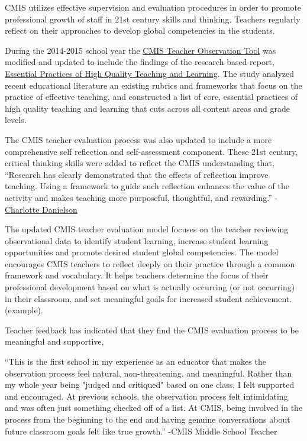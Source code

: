
\begin{findings}
CMIS utilizes effective supervision and evaluation procedures in order to promote professional growth of staff in 21st century skills and thinking. Teachers regularly reflect on their approaches to develop global competencies in the students.

During the 2014-2015 school year the \href{https://docs.google.com/document/d/15_5X5QtixmWVheEUBVO9N1aislsLDm_ZW4-4g4YQ7F4/edit?usp=sharing}{CMIS Teacher Observation Tool} was modified and updated to include the findings of the research based report, \href{https://drive.google.com/a/cmis.ac.th/file/d/0Bwny3HLdIIS7bXJ0dEpCWG51MTQ/view?usp=sharing}{Essential Practices of High Quality Teaching and Learning}. The study analyzed recent educational literature an existing rubrics and frameworks that focus on the practice of effective teaching, and constructed a list of core, essential practices of high quality teaching and learning that cuts across all content areas and grade levels. 

The CMIS teacher evaluation process was also updated to include a more comprehensive self reflection and self-assessment component. These 21st century, critical thinking skills were added to reflect the CMIS understanding that, ``Research has clearly demonstrated that the effects of reflection improve teaching. Using a framework to guide such reflection enhances the value of the activity and makes teaching more purposeful, thoughtful, and rewarding.'' -\href{http://www.ascd.org/publications/books/106034/chapters/Using-the-Framework.aspx}{Charlotte Danielson} 

The updated CMIS teacher evaluation model focuses on the teacher reviewing observational data to identify student learning, increase student learning opportunities and promote desired student global competencies. The  model encourages CMIS teachers to reflect deeply on their practice through a common framework and vocabulary. It helps teachers determine the focus of their professional development based on what is actually occurring (or not occurring) in their classroom, and set meaningful goals for increased student achievement. (example).

Teacher feedback has indicated that they find the CMIS evaluation process to be meaningful and supportive,  

``This is the first school in my experience as an educator that makes the observation process feel natural, non-threatening, and meaningful. Rather than my whole year being "judged and critiqued" based on one class, I felt supported and encouraged. At previous schools, the observation process felt intimidating and was often just something checked off of a list. At CMIS, being involved in the process from the beginning to the end and having genuine conversations about future classroom goals felt like true growth.''
                                                                                            -CMIS Middle School Teacher


\end{findings}
